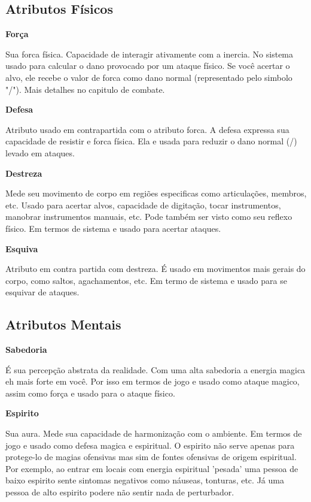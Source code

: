 \subsection{Atributos Físicos}

\textbf{Força}
 
Sua forca física. Capacidade de interagir ativamente com a inercia. No sistema usado para calcular o dano provocado por um ataque físico. Se você acertar o alvo, ele recebe o valor de forca como dano normal (representado pelo simbolo "/"). Mais detalhes no capitulo de combate.

\textbf{Defesa}

Atributo usado em contrapartida com o atributo forca. A defesa expressa sua capacidade de resistir e forca física. Ela e usada para reduzir o dano normal (/) levado em ataques. 

\textbf{Destreza}

Mede seu movimento de corpo em regiões especificas como articulações, membros, etc. Usado para acertar alvos, capacidade de digitação, tocar instrumentos, manobrar instrumentos manuais, etc. Pode também ser visto como seu reflexo físico. Em termos de sistema e usado para acertar ataques.

\textbf{Esquiva}

Atributo em contra partida com destreza. É usado em movimentos mais gerais do corpo, como saltos, agachamentos, etc. Em termo de sistema e usado para se esquivar de ataques.

\subsection{Atributos Mentais}

\textbf{Sabedoria}

É sua percepção abstrata da realidade. Com uma alta sabedoria a energia magica eh mais forte em você. Por isso em termos de jogo e usado como ataque magico, assim como força e usado para o ataque físico. 

\textbf{Espirito}

Sua aura. Mede sua capacidade de harmonização com o ambiente. Em termos de jogo e usado como defesa magica e espiritual. O espirito não serve apenas para protege-lo de magias ofensivas mas sim de fontes ofensivas de origem espiritual. Por exemplo, ao entrar em locais com energia espiritual 'pesada' uma pessoa de baixo espirito sente sintomas negativos como náuseas, tonturas, etc. Já uma pessoa de alto espirito podere não sentir nada de perturbador.

